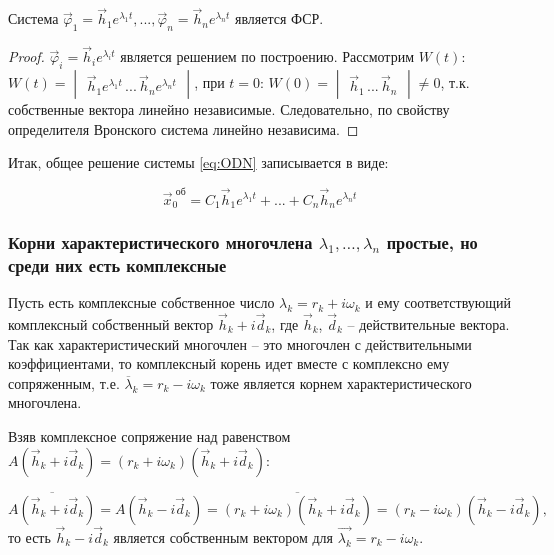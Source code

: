 \begin{lemma}
Система $\overrightarrow{\varphi}_1 = \overrightarrow{h}_1 e^{\lambda_1 t}, ..., \overrightarrow{\varphi}_n = \overrightarrow{h}_n e^{\lambda_n t}$ является ФСР. 
\end{lemma}

\begin{proof}
  $\overrightarrow{\varphi}_i = \overrightarrow{h}_i e^{\lambda_i t}$ является решением по построению. Рассмотрим $W(t)$: $W(t) = \begin{vmatrix*} \overrightarrow{h}_1 e^{\lambda_1 t} \,...\, \overrightarrow{h}_n e^{\lambda_n t}\end{vmatrix*}$, 
  при $t = 0$: $W(0) = \begin{vmatrix*} \overrightarrow{h}_1 \, ... \, \overrightarrow{h}_n \end{vmatrix*} \neq 0$, т.к. собственные вектора линейно независимые. 
  Следовательно, по свойству определителя Вронского система линейно независима.
\end{proof}

Итак, общее решение системы \eqref{eq:ODN} записывается в виде: 

\begin{equation*}
  \boxed{\overrightarrow{x}^{\text{ об}}_0 = C_1 \overrightarrow{h}_1 e^{\lambda_1 t} + ... + C_n \overrightarrow{h}_n e^{\lambda_n t}}
\end{equation*}

\subsubsection*{Корни характеристического многочлена $\lambda_1, \dots, \lambda_n$ простые, но среди них есть комплексные}

Пусть есть комплексные собственное число $\lambda_k = r_k + i \omega_k$ и ему соответствующий комплексный собственный вектор $\overrightarrow{h}_k + i \overrightarrow{d}_k $, 
где $\overrightarrow{h}_k$, $\overrightarrow{d}_k$ -- действительные вектора. Так как характеристический многочлен -- это многочлен с действительными коэффициентами, 
то комплексный корень идет вместе с комплексно ему сопряженным, т.е. $\overline{\lambda}_k = r_k - i \omega_k$ тоже является корнем характеристического многочлена. 

Взяв комплексное сопряжение над равенством $A (\overrightarrow{h}_k + i \overrightarrow{d}_k) = (r_k + i \omega_k)(\overrightarrow{h}_k + i \overrightarrow{d}_k)$:

\[ \overline{A (\overrightarrow{h}_k + i \overrightarrow{d}_k)} = A (\overrightarrow{h}_k - i \overrightarrow{d}_k) = \overline{(r_k + i \omega_k)(\overrightarrow{h}_k + i \overrightarrow{d}_k)} = (r_k - i \omega_k)(\overrightarrow{h}_k - i \overrightarrow{d}_k), \]
то есть $\overrightarrow{h}_k - i \overrightarrow{d}_k$ является собственным вектором для $\overrightarrow{\lambda_k} = r_k - i \omega_k$.

